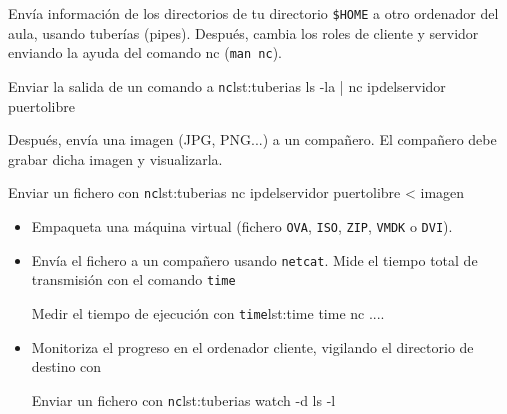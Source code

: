 \begin{homeworkProblem}
  Envía información de los directorios de tu directorio \texttt{\$HOME} a otro ordenador del aula, usando tuberías (pipes). Después, cambia los roles de cliente y servidor enviando la ayuda del comando nc (\texttt{man nc}).

  
  \begin{listadoshell}{Enviar la salida de un comando a \texttt{nc}}{lst:tuberias}
    ls -la | nc ipdelservidor puertolibre
  \end{listadoshell}

  Después, envía una imagen (JPG, PNG...) a un compañero. El compañero debe grabar dicha imagen y visualizarla.

  \begin{listadoshell}{Enviar un fichero con \texttt{nc}}{lst:tuberias}
    nc ipdelservidor puertolibre < imagen
  \end{listadoshell}
\end{homeworkProblem}


\begin{homeworkProblem}
  \begin{itemize}
  \item Empaqueta una máquina virtual (fichero \texttt{OVA}, \texttt{ISO}, \texttt{ZIP}, \texttt{VMDK} o \texttt{DVI}).
  \item Envía el fichero a un compañero usando \texttt{netcat}. Mide el tiempo total de transmisión con el comando \texttt{time}

    \begin{listadoshell}{Medir el tiempo de ejecución con  \texttt{time}}{lst:time}
    time nc ....
  \end{listadoshell}
    
  \item Monitoriza el progreso en el ordenador cliente, vigilando el directorio de destino con

  \begin{listadoshell}{Enviar un fichero con \texttt{nc}}{lst:tuberias}
    watch -d ls -l
  \end{listadoshell}

    
  \end{itemize}
\end{homeworkProblem}

